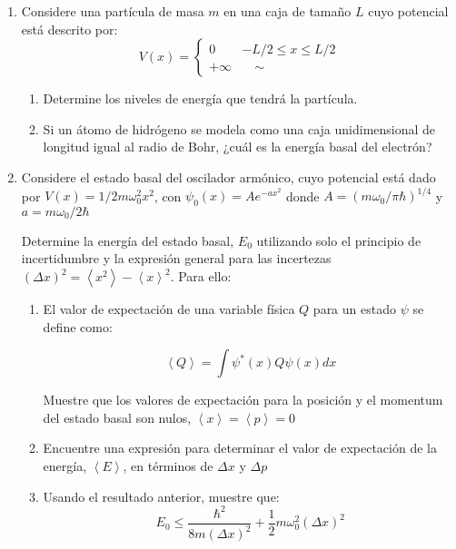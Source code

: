 \documentclass[letterpaper,11pt]{article}
\begin{document}
\begin{enumerate}\setlength{\itemsep}{0.4cm}

\item Considere una partícula de masa $m$ en una caja de tamaño $L$ cuyo potencial está descrito por:
\[V(x) = 
    \begin{cases}
        0 & -L/2\leq x\leq L/2\\
        +\infty & \quad \sim
    \end{cases}
\]

    \begin{enumerate}

        \item Determine los niveles de energía que tendrá la partícula.
        
        \item Si un átomo de hidrógeno se modela como una caja unidimensional de longitud igual al radio de Bohr, ¿cuál es la energía basal del electrón?
\end{enumerate}

\item Considere el estado basal del oscilador armónico, cuyo potencial está dado por $V(x) = 1/2 m\omega_0^2 x^2$, con $\psi_0(x) = A e^{-ax^2}$ donde $A = (m\omega_0/\pi\hbar)^{1/4}$ y $a=m\omega_0/2\hbar$

Determine la energía del estado basal, $E_0$ utilizando solo el principio de incertidumbre y la expresión general para las incertezas $(\Delta x)^2 = \left<x^2\right> - \left<x\right>^2$. Para ello:

\begin{enumerate}
    \item El valor de expectación de una variable física $Q$ para un estado $\psi$ se define como:

    $$ \left<Q\right> = \int \psi^{*}(x) Q \psi(x) dx$$
    
    Muestre que los valores de expectación para la posición y el momentum del estado basal son nulos, $\left<x\right> = \left<p\right> = 0$

    \item Encuentre una expresión para determinar el valor de expectación de la energía, $\left<E\right>$, en términos de $\Delta x$ y $\Delta p$

    \item Usando el resultado anterior, muestre que:
    $$E_0 \leq \frac{\hbar^2}{8m(\Delta x)^2} + \frac{1}{2}m\omega_0^2(\Delta x)^2$$


\end{enumerate}
\end{enumerate}
\end{document}
